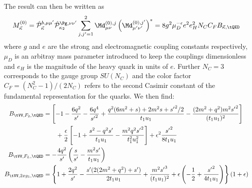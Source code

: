 The result can then be written as
\begin{equation}
M_{\vec \kappa}^{(0)} = \hat {\mathcal P}_{\vec \kappa}^{b,\mu\mu'}\hat {\mathcal P}_{\kappa_2}^{\Pg,\nu\nu'}\sum_{j,j'=1}^2\Md^{(0),j}_{\mu\nu}\left(\Md^{(0),j'}_{\mu'\nu'}\right)^* = 8g^2\mu_D^{-\epsilon}e^2e_H^2 N_C C_F B_{\vec \kappa,\tQED}
\end{equation}
where $g$ and $e$ are the strong and electromagnetic coupling constants respectively, $\mu_D$ is an arbitray mass parameter introduced to keep the couplings dimensionless and $e_H$ is the magnitude of the heavy quark in units of $e$. Further $N_C=3$ corresponds to the gauge group $SU(N_C)$ and the color factor $C_F=(N_C^2-1)/(2N_C)$ refers to the second Casimir constant of the fundamental representation for the quarks. We then find:
\begin{align}
B_{\tVV,F_2,\tQED} &= \left[-1 - \frac{6q^2}{s'} - \frac{6q^4}{{s'}^2} + \frac{q^2(6m^2+s) +2m^2 s + {s'}^2/2}{t_1u_1} - \frac{(2m^2+q^2)m^2{s'}^2}{(t_1 u_1)^2} \right] \nonumber\\
 &\hspace{20pt}+\frac{\epsilon}{2}\left[ -1 + \frac{s^2-q^2s'}{t_1u_1} - \frac{m^2q^2{s'}^2}{t_1^2u_1^2} \right] + \epsilon^2\frac{{s'}^2}{8t_1u_1}\\
B_{\tVV,F_L,\tQED} &= -\frac{4q^2}{s'}\left(\frac s {s'} - \frac{m^2s'}{t_1u_1}\right)\\
B_{\tVV,2xg_1,\tQED} &= \left\{1+ \frac{2q^2}{s'} - \frac{s'(2(2m^2+q^2)+s')}{2t_1 u_1} + \frac{m^2{s'}^3}{(t_1u_1)^2}+\epsilon\left(-\frac 1 2 + \frac{{s'}^2}{4t_1u_1}\right)\right\}(1+\epsilon)
\end{align}
